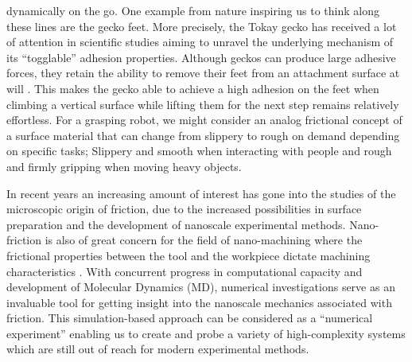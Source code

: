 dynamically on the go. One example from nature inspiring us to think along
these lines are the gecko feet. More precisely, the Tokay gecko has received a
lot of attention in scientific studies aiming to unravel the underlying
mechanism of its ``togglable'' adhesion properties. Although geckos can
produce large adhesive forces, they retain the ability to remove their feet from
an attachment surface at will \cite{Gekko}. This makes the gecko able to achieve a high adhesion on the feet when climbing a vertical surface while lifting them for the next step remains relatively effortless. For a grasping robot, we might
consider an analog frictional concept of a surface material that can change from
slippery to rough on demand depending on specific tasks; Slippery and smooth when interacting with people and rough and firmly gripping when moving heavy objects.


In recent years an increasing amount of interest has gone into the studies of
the microscopic origin of friction, due to the increased possibilities in
surface preparation and the development of nanoscale experimental methods.
Nano-friction is also of great concern for the field of nano-machining where the
frictional properties between the tool and the workpiece dictate machining
characteristics \cite{kim_nano-scale_2009}. With concurrent progress in
computational capacity and development of Molecular Dynamics (\acrshort{MD}),
numerical investigations serve as an invaluable tool for getting insight into
the nanoscale mechanics associated with friction. This simulation-based approach
can be considered as a ``numerical experiment'' enabling us to create and probe
a variety of high-complexity systems which are still out of reach for modern
experimental methods.

